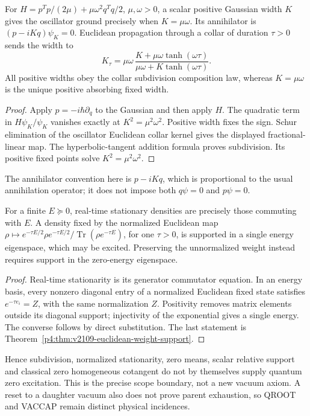\documentclass[12pt,a4paper]{article}
\begin{document}
\begin{proposition}
\label{p4:prop:v2109-ground-width-collar}
For \(H=p^Tp/(2\mu)+\mu\omega^2q^Tq/2\), \(\mu,\omega>0\), a scalar
positive Gaussian width \(K\) gives the oscillator ground precisely when
\(K=\mu\omega\).  Its annihilator is
\((p-iKq)\psi_K=0\).  Euclidean propagation through a collar of duration
\(\tau>0\) sends the width to
\[
 K_\tau=\mu\omega\,
 \frac{K+\mu\omega\tanh(\omega\tau)}
 {\mu\omega+K\tanh(\omega\tau)}.
\]
All positive widths obey the collar subdivision composition law, whereas
\(K=\mu\omega\) is the unique positive absorbing fixed width.
\end{proposition}
\begin{proof}
Apply \(p=-i\hbar\partial_q\) to the Gaussian and then apply \(H\).
The quadratic term in \(H\psi_K/\psi_K\) vanishes exactly at
\(K^2=\mu^2\omega^2\).  Positive width fixes the sign.  Schur
elimination of the oscillator Euclidean collar kernel gives the displayed
fractional-linear map.  The hyperbolic-tangent addition formula proves
subdivision.  Its positive fixed points solve \(K^2=\mu^2\omega^2\).
\end{proof}
The annihilator convention here is \(p-iKq\), which is proportional to
the usual annihilation operator; it does not impose both \(q\psi=0\)
and \(p\psi=0\).

\begin{proposition}
\label{p4:prop:v2109-stationarity-distinction}
For a finite \(E\succeq0\), real-time stationary densities are precisely
those commuting with \(E\).  A density fixed by the normalized Euclidean
map \(\rho\mapsto e^{-\tau E/2}\rho e^{-\tau E/2}/
\operatorname{Tr}(\rho e^{-\tau E})\), for one \(\tau>0\), is supported
in a single energy eigenspace, which may be excited.  Preserving the
unnormalized weight instead requires support in the zero-energy eigenspace.
\end{proposition}
\begin{proof}
Real-time stationarity is its generator commutator equation.  In an energy
basis, every nonzero diagonal entry of a normalized Euclidean fixed state
satisfies \(e^{-\tau e_i}=Z\), with the same normalization \(Z\).
Positivity removes matrix elements outside its diagonal support; injectivity
of the exponential gives a single energy.  The converse follows by direct
substitution.  The last statement is
Theorem~\ref{p4:thm:v2109-euclidean-weight-support}.
\end{proof}
Hence subdivision, normalized stationarity, zero means, scalar relative
support and classical zero homogeneous cotangent do not by themselves
supply quantum zero excitation.  This is the precise scope boundary, not a
new vacuum axiom.  A reset to a daughter vacuum also does not prove parent
exhaustion, so QROOT and VACCAP remain distinct physical incidences.
\end{document}
